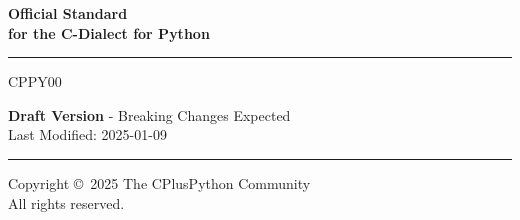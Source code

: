 \begin{titlepage}
    \vspace*{3cm}
    \begin{adjustwidth}{5cm}{0cm}

        {\selectfont \bfseries \Huge
        Official Standard \\
        for the C-Dialect for Python

        \noindent\rule{\linewidth}{1mm}

        \vspace*{1cm}

        \noindent CPPY00
        }

        \vspace*{8cm}

        {\selectfont \Large \noindent
        \textbf{Draft Version} - Breaking Changes Expected \\
        Last Modified: 2025-01-09
        }

        \vspace*{4cm}

        \noindent\rule{\linewidth}{0.5mm}

        {\selectfont \large \noindent
        Copyright \copyright \ 2025 The CPlusPython Community \\
        All rights reserved.
        
        }
    \end{adjustwidth}
\end{titlepage}